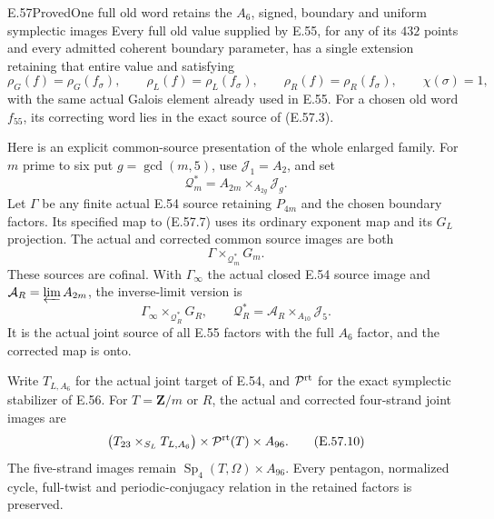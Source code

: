 \begin{statement}{E.57}{Proved}{One full old word retains the $A_6$, signed, boundary and uniform symplectic images}
Every full old value supplied by E.55, for any of its
$432$ points and every admitted coherent boundary
parameter, has a single extension retaining that entire
value and satisfying
\[
       \rho_G(f)=\rho_G(f_\sigma),\qquad
       \rho_L(f)=\rho_L(f_\sigma),\qquad
       \rho_R(f)=\rho_R(f_\sigma),\qquad \chi(\sigma)=1,
 \tag{E.57.6}
\]
with the same actual Galois element already used in E.55.
For a chosen old word $f_{55}$, its correcting word lies
in the exact source of \textup{(E.57.3)}.

Here is an explicit common-source presentation of the
whole enlarged family.  For $m$ prime to six put
$g=\gcd(m,5)$, use $\mathcal J_1=A_2$, and set
\[
 \mathcal Q_m^{\!*}
      =A_{2m}\times_{A_{2g}}\mathcal J_g.
 \tag{E.57.7}
\]
Let $\Gamma$ be any finite actual E.54 source retaining
$P_{4m}$ and the chosen boundary factors.  Its specified
map to \textup{(E.57.7)} uses its ordinary exponent
map and its $G_L$ projection.  The actual and corrected
common source images are both
\[
                         \Gamma\times_{\mathcal Q_m^{\!*}}G_m.
 \tag{E.57.8}
\]
These sources are cofinal.  With $\Gamma_\infty$ the
actual closed E.54 source image and
$\mathcal A_R=\varprojlim A_{2m}$, the inverse-limit
version is
\[
 \Gamma_\infty\times_{\mathcal Q_R^{\!*}}G_R,
 \qquad
 \mathcal Q_R^{\!*}=\mathcal A_R\times_{A_{10}}\mathcal J_5.
 \tag{E.57.9}
\]
It is the actual joint source of all E.55 factors with
the full $A_6$ factor, and the corrected map is onto.

Write $T_{L,A_6}$ for the actual joint target of E.54,
and $\mathcal P^{\rm rt}$ for the exact symplectic
stabilizer of E.56.  For $T=\mathbf Z/m$ or $R$, the
actual and corrected four-strand joint images are
\[
   \bigl(T_{23}\times_{S_L}T_{L,A_6}\bigr)
                       \times\mathcal P^{\rm rt}(T)\times A_{96}.
 \tag{E.57.10}
\]
The five-strand images remain
$\operatorname{Sp}_4(T,\Omega)\times A_{96}$.
Every pentagon, normalized cycle, full-twist and
periodic-conjugacy relation in the retained factors
is preserved.
\end{statement}

